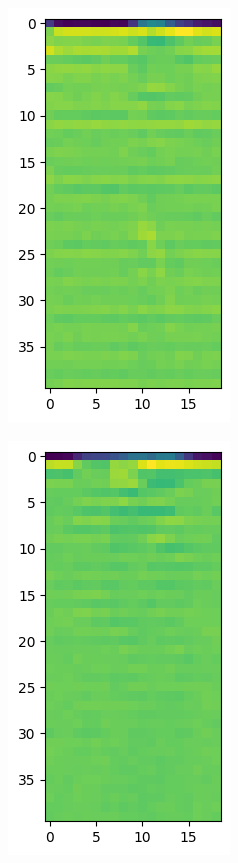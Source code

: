 \documentclass{report}
\theoremstyle{definition}
\theoremstyle{remark}
\begin{document}
\begin{minipage}{\textwidth}
\centering
\vspace{2ex}
\begin{minipage}{.4\textwidth}
    \centering
    \includegraphics[scale=0.4]{img/mfcc.png}
    \label{fig:mfcc_poison}
\end{minipage}
\begin{minipage}{.4\textwidth}
    \centering
    \includegraphics[scale=0.4]{img/mfcc_nopoison.png}
    \label{fig:mfcc_regular}
\end{minipage}
\end{minipage}
\end{document}

